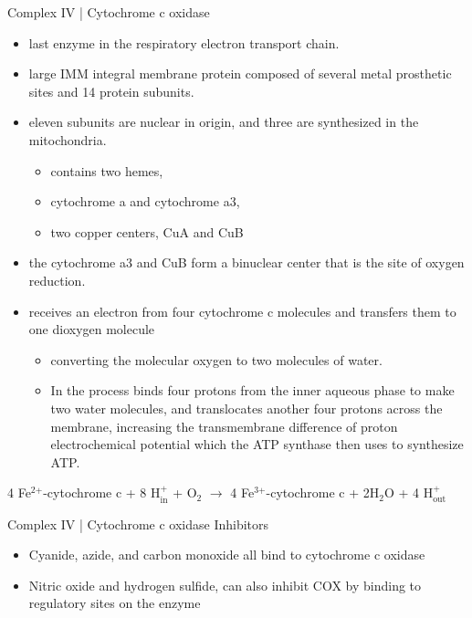 \documentclass[presentation, smaller]{beamer}
\begin{document}
\begin{frame}[label={sec:orgb5a50c4}]{Complex IV | Cytochrome c oxidase}
\begin{itemize}
\item last enzyme in the respiratory electron transport chain.
\item large IMM integral membrane protein composed of several metal prosthetic sites and 14 protein subunits.
\item eleven subunits are nuclear in origin, and three are synthesized in the mitochondria. 
\begin{itemize}
\item contains two hemes,
\item cytochrome a and cytochrome a3,
\item two copper centers, CuA and CuB
\end{itemize}
\item the cytochrome a3 and CuB form a binuclear center that is the site of oxygen reduction.

\item receives an electron from four cytochrome c molecules and transfers them to one dioxygen molecule
\begin{itemize}
\item converting the molecular oxygen to two molecules of water.
\item In the process binds four protons from the inner aqueous phase
to make two water molecules, and translocates another four protons
across the membrane, increasing the transmembrane difference of
proton electrochemical potential which the ATP synthase then uses to
synthesize ATP.
\end{itemize}
\end{itemize}

4 Fe\(^{\text{2+}}\)-cytochrome c + 8 H\(^{\text{+}}_{\text{in}}\) + O\(_{\text{2}}\) \(\to\)  4 Fe\(^{\text{3+}}\)-cytochrome c + 2H\(_{\text{2}}\)O + 4 H\(^{\text{+}}_{\text{out}}\)
\end{frame}


\begin{frame}[label={sec:org03f1af2}]{Complex IV | Cytochrome c oxidase Inhibitors}
\begin{itemize}
\item Cyanide, azide, and carbon monoxide all bind to cytochrome c
oxidase

\item Nitric oxide and hydrogen sulfide, can also inhibit COX by
binding to regulatory sites on the enzyme
\end{itemize}
\end{frame}
\end{document}
